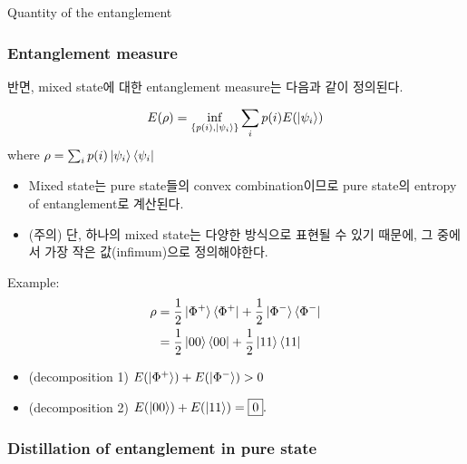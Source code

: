 \documentclass[9pt]{beamer}
\begin{document}
\begin{section}{Quantity of the entanglement}
        \begin{frame}
            \frametitle{Entanglement measure}
            반면, mixed state에 대한 entanglement measure는 다음과 같이 정의된다. 
            \begin{definition}
                \vspace{-0.2cm}
                \begin{equation*}
                    E(\rho) = \inf_{\{p(i), \ket{\psi_i}\}} \sum_i p(i) E(\ket{\psi_i})
                \end{equation*}
                where $\rho = \sum_i p(i) \ket{\psi_i} \bra{\psi_i}$
            \end{definition}
            \begin{itemize}
                \item Mixed state는 pure state들의 convex combination이므로 pure state의 entropy of entanglement로 계산된다.
                \item (주의) 단, 하나의 mixed state는 다양한 방식으로 표현될 수 있기 때문에, 그 중에서 가장 작은 값(infimum)으로 정의해야한다.
            \end{itemize}

            \vspace{0.2cm}
            Example: 
            \vspace{-0.4cm}
            \begin{align*}
                \rho    &= \frac{1}{2} \ket{\Phi^+} \bra{\Phi^+} + \frac{1}{2} \ket{\Phi^-} \bra{\Phi^-} \\
                        &= \frac{1}{2} \ket{00} \bra{00} + \frac{1}{2} \ket{11} \bra{11} 
            \end{align*}
            \vspace{-0.2cm}
            \begin{itemize}
                \item (decomposition 1) $E(\ket{\Phi^+}) + E(\ket{\Phi^-}) > 0$ 
                \item (decomposition 2) $E(\ket{00}) + E(\ket{11}) = \boxed{0}.$
            \end{itemize}
        \end{frame}

        \begin{frame}
            \frametitle{Distillation of entanglement in pure state}
            

\end{frame}
\end{section}
\end{document}
